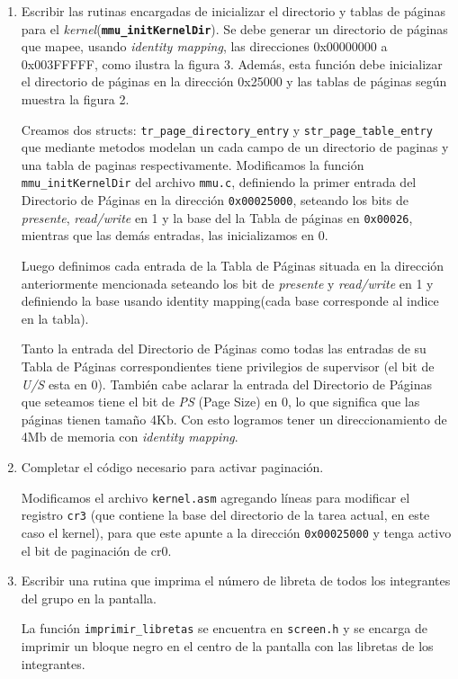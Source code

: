 \documentclass[a4paper]{article}
\begin{document}
 \begin{enumerate}[label=\alph*)]
 	
 	\item Escribir las rutinas encargadas de inicializar el directorio y tablas de páginas para el	\textit{kernel}(\texttt{\textbf{mmu_initKernelDir}}). Se debe generar un directorio de páginas que mapee, usando \textit{identity mapping}, las direcciones 0x00000000 a 0x003FFFFF, como ilustra la figura 3. Además, esta función debe inicializar el directorio de páginas en la dirección 0x25000 y las tablas de páginas según muestra la figura 2.
 	
 
 	Creamos dos structs: \texttt{tr\_page\_directory\_entry} y \texttt{str\_page\_table\_entry} que mediante metodos modelan un cada campo de un directorio de paginas y una tabla de paginas respectivamente.
 	Modificamos la función \texttt{mmu\_initKernelDir} del archivo \texttt{mmu.c}, definiendo la primer entrada del Directorio de P\'aginas en la direcci\'on \texttt{0x00025000}, seteando los bits de \textit{presente}, \textit{read/write} en 1 y la base del la Tabla de p\'aginas en \texttt{0x00026}, mientras que las demás entradas, las inicializamos en 0.
 	
 	Luego definimos cada entrada de la Tabla de P\'aginas situada en la direcci\'on anteriormente mencionada seteando los bit de \textit{presente} y \textit{read/write} en 1 y definiendo la base usando identity mapping(cada base corresponde al indice en la tabla). 
 	
 	Tanto la entrada del Directorio de P\'aginas como todas las entradas de su Tabla de P\'aginas correspondientes tiene privilegios de supervisor (el bit de \textit{U/S} esta en 0). Tambi\'en cabe aclarar la entrada del Directorio de P\'aginas que seteamos tiene el bit de \textit{PS} (Page Size) en 0, lo que significa que las p\'aginas tienen tama\~no 4Kb. Con esto logramos tener un direccionamiento de 4Mb de memoria con \textit{identity mapping}.
 	
 	\item Completar el código necesario para activar paginación.
 	
 	Modificamos el archivo \texttt{kernel.asm} agregando l\'ineas para modificar el registro \texttt{cr3} (que contiene la base del directorio de la tarea actual, en este caso el kernel), para que este apunte a la dirección \texttt{0x00025000} y tenga activo el bit de paginación de cr0.
 	
 	\item Escribir una rutina que imprima el número de libreta de todos los integrantes del grupo en la pantalla.
 	
 	La funci\'on \texttt{imprimir\_libretas} se encuentra en \texttt{screen.h} y se encarga de imprimir un bloque negro en el centro de la pantalla con las libretas de los integrantes.
 \end{enumerate}
 
\end{document}
